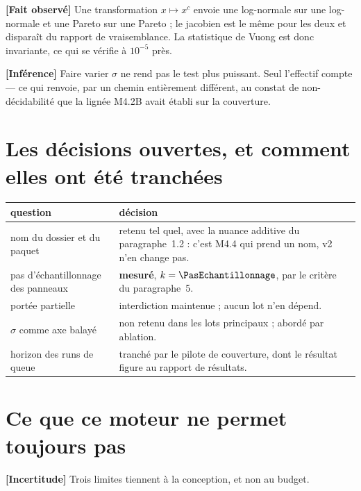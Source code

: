 \documentclass[11pt,a4paper]{article}
\newcommand{\fait}{\textbf{[Fait observé]}}
\newcommand{\inference}{\textbf{[Inférence]}}
\newcommand{\incertitude}{\textbf{[Incertitude]}}
\begin{document}
\fait{} Une transformation $x \mapsto x^c$ envoie une log-normale sur une
log-normale et une Pareto sur une Pareto ; le jacobien est le même pour les
deux et disparaît du rapport de vraisemblance. La statistique de Vuong est
donc invariante, ce qui se vérifie à $10^{-5}$ près.

\inference{} Faire varier $\sigma$ ne rend pas le test plus puissant. Seul
l'effectif compte --- ce qui renvoie, par un chemin entièrement différent, au
constat de non-décidabilité que la lignée M4.2B avait établi sur la
couverture.

\section{Les décisions ouvertes, et comment elles ont été tranchées}

\begin{longtable}{@{}p{}p{}@{}}
\toprule
\textbf{question} & \textbf{décision} \\
\midrule
\endhead
nom du dossier et du paquet & retenu tel quel, avec la nuance additive du
paragraphe~1.2 : c'est M4.4 qui prend un nom, v2 n'en change pas. \\
\addlinespace
pas d'échantillonnage des panneaux & \textbf{mesuré}, $k = \PasEchantillonnage$,
par le critère du paragraphe~5. \\
\addlinespace
portée partielle & interdiction maintenue ; aucun lot n'en dépend. \\
\addlinespace
$\sigma$ comme axe balayé & non retenu dans les lots principaux ; abordé par
ablation. \\
\addlinespace
horizon des runs de queue & tranché par le pilote de couverture, dont le
résultat figure au rapport de résultats. \\
\bottomrule
\end{longtable}

\section{Ce que ce moteur ne permet toujours pas}

\incertitude{} Trois limites tiennent à la conception, et non au budget.
\end{document}
